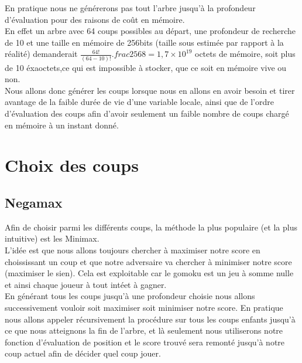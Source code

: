 \documentclass{article}
\begin{document}
En pratique nous ne générerons pas tout l'arbre jusqu'à la profondeur d'évaluation pour des raisons de coût en mémoire.\\
En effet un arbre avec 64 coups possibles au départ, une profondeur de recherche de 10 et une taille en mémoire de 256bits
(taille sous estimée par rapport à la réalité) demanderait $ \frac{64!}{(64-10)!}.frac{256}{8} = 1,7\times 10^{19}$ octets de mémoire, 
soit plus de 10 éxaoctets,ce qui est impossible à stocker, que ce soit en mémoire vive ou non.\\
Nous allons donc générer les coups lorsque nous en allons en avoir besoin et tirer avantage de la faible durée de vie d'une variable locale, ainsi
que de l'ordre d'évaluation des coups afin d'avoir seulement un faible nombre de coups chargé en mémoire à un instant donné.

\pagebreak
\section{Choix des coups}
\subsection{Negamax}

Afin de choisir parmi les différents coups, la méthode la plus populaire (et la plus intuitive) est les Minimax.\\
L'idée est que nous allons toujours chercher à maximiser notre score en choississant un coup et que notre
adversaire va chercher à minimiser notre score (maximiser le sien). Cela est exploitable car le gomoku est un jeu
à somme nulle et ainsi chaque joueur à tout intéet à gagner.\\
En générant tous les coups jusqu'à une profondeur choisie nous allons successivement vouloir soit maximiser soit minimiser
notre score. En pratique nous allons appeler récursivement la procédure sur tous les coups enfants jusqu'à ce que nous
atteignons la fin de l'arbre, et là seulement nous utiliserons notre fonction d'évaluation de position et le score 
trouvé sera remonté jusqu'à notre coup actuel afin de décider quel coup jouer.\\
\end{document}
